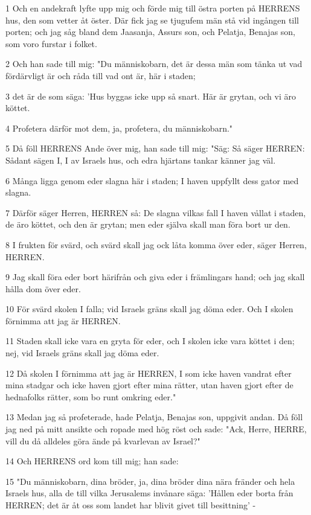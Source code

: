 \par 1 Och en andekraft lyfte upp mig och förde mig till östra porten på HERRENS hus, den som vetter åt öster. Där fick jag se tjugufem män stå vid ingången till porten; och jag såg bland dem Jaasanja, Assurs son, och Pelatja, Benajas son, som voro furstar i folket.
\par 2 Och han sade till mig: "Du människobarn, det är dessa män som tänka ut vad fördärvligt är och råda till vad ont är, här i staden;
\par 3 det är de som säga: 'Hus byggas icke upp så snart. Här är grytan, och vi äro köttet.
\par 4 Profetera därför mot dem, ja, profetera, du människobarn."
\par 5 Då föll HERRENS Ande över mig, han sade till mig: "Säg: Så säger HERREN: Sådant sägen I, I av Israels hus, och edra hjärtans tankar känner jag väl.
\par 6 Många ligga genom eder slagna här i staden; I haven uppfyllt dess gator med slagna.
\par 7 Därför säger Herren, HERREN så: De slagna vilkas fall I haven vållat i staden, de äro köttet, och den är grytan; men eder själva skall man föra bort ur den.
\par 8 I frukten för svärd, och svärd skall jag ock låta komma över eder, säger Herren, HERREN.
\par 9 Jag skall föra eder bort härifrån och giva eder i främlingars hand; och jag skall hålla dom över eder.
\par 10 För svärd skolen I falla; vid Israels gräns skall jag döma eder. Och I skolen förnimma att jag är HERREN.
\par 11 Staden skall icke vara en gryta för eder, och I skolen icke vara köttet i den; nej, vid Israels gräns skall jag döma eder.
\par 12 Då skolen I förnimma att jag är HERREN, I som icke haven vandrat efter mina stadgar och icke haven gjort efter mina rätter, utan haven gjort efter de hednafolks rätter, som bo runt omkring eder."
\par 13 Medan jag så profeterade, hade Pelatja, Benajas son, uppgivit andan. Då föll jag ned på mitt ansikte och ropade med hög röst och sade: "Ack, Herre, HERRE, vill du då alldeles göra ände på kvarlevan av Israel?"
\par 14 Och HERRENS ord kom till mig; han sade:
\par 15 "Du människobarn, dina bröder, ja, dina bröder dina nära fränder och hela Israels hus, alla de till vilka Jerusalems invånare säga: 'Hållen eder borta från HERREN; det är åt oss som landet har blivit givet till besittning' -
